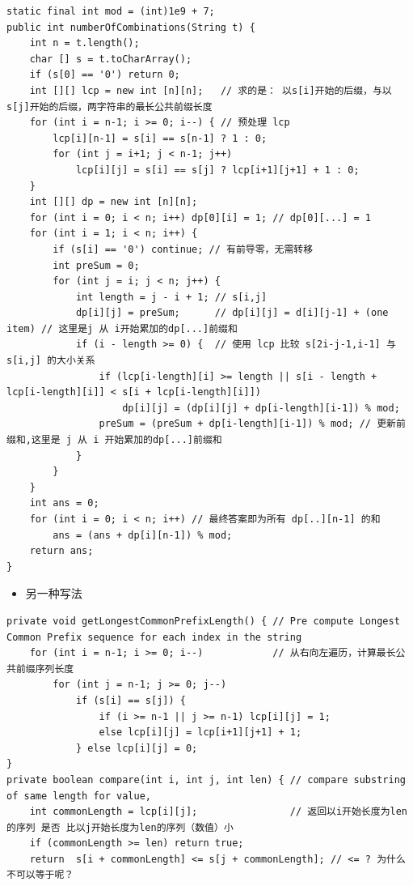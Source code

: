 \documentclass[9pt, b5paaper]{book}
\begin{document}
\begin{enumerate}
\begin{verbatim}
static final int mod = (int)1e9 + 7;
public int numberOfCombinations(String t) {
    int n = t.length();
    char [] s = t.toCharArray();
    if (s[0] == '0') return 0;
    int [][] lcp = new int [n][n];   // 求的是： 以s[i]开始的后缀，与以s[j]开始的后缀，两字符串的最长公共前缀长度
    for (int i = n-1; i >= 0; i--) { // 预处理 lcp
        lcp[i][n-1] = s[i] == s[n-1] ? 1 : 0;
        for (int j = i+1; j < n-1; j++) 
            lcp[i][j] = s[i] == s[j] ? lcp[i+1][j+1] + 1 : 0;
    }
    int [][] dp = new int [n][n];
    for (int i = 0; i < n; i++) dp[0][i] = 1; // dp[0][...] = 1
    for (int i = 1; i < n; i++) {
        if (s[i] == '0') continue; // 有前导零，无需转移
        int preSum = 0;
        for (int j = i; j < n; j++) {
            int length = j - i + 1; // s[i,j]
            dp[i][j] = preSum;      // dp[i][j] = d[i][j-1] + (one item) // 这里是j 从 i开始累加的dp[...]前缀和
            if (i - length >= 0) {  // 使用 lcp 比较 s[2i-j-1,i-1] 与 s[i,j] 的大小关系
                if (lcp[i-length][i] >= length || s[i - length + lcp[i-length][i]] < s[i + lcp[i-length][i]])
                    dp[i][j] = (dp[i][j] + dp[i-length][i-1]) % mod;
                preSum = (preSum + dp[i-length][i-1]) % mod; // 更新前缀和,这里是 j 从 i 开始累加的dp[...]前缀和
            }
        }
    }
    int ans = 0;
    for (int i = 0; i < n; i++) // 最终答案即为所有 dp[..][n-1] 的和
        ans = (ans + dp[i][n-1]) % mod;
    return ans;
}
\end{verbatim}
\begin{itemize}
\item 另一种写法
\end{itemize}
\begin{verbatim}
private void getLongestCommonPrefixLength() { // Pre compute Longest Common Prefix sequence for each index in the string
    for (int i = n-1; i >= 0; i--)            // 从右向左遍历，计算最长公共前缀序列长度
        for (int j = n-1; j >= 0; j--) 
            if (s[i] == s[j]) {
                if (i >= n-1 || j >= n-1) lcp[i][j] = 1;
                else lcp[i][j] = lcp[i+1][j+1] + 1;
            } else lcp[i][j] = 0;
}
private boolean compare(int i, int j, int len) { // compare substring of same length for value, 
    int commonLength = lcp[i][j];                // 返回以i开始长度为len的序列 是否 比以j开始长度为len的序列（数值）小
    if (commonLength >= len) return true;
    return  s[i + commonLength] <= s[j + commonLength]; // <= ? 为什么不可以等于呢？

\end{verbatim}
\end{enumerate}
\end{document}
